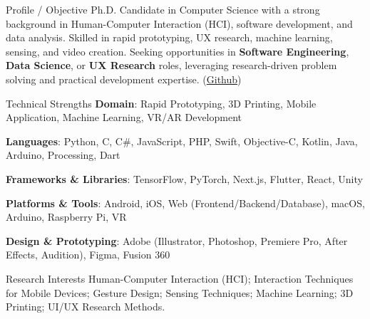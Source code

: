 \documentclass[
    11pt, %
]{resume} %
\begin{document}
\begin{rSection}{Profile / Objective}
Ph.D. Candidate in Computer Science with a strong background in Human-Computer Interaction (HCI), software development, and data analysis. Skilled in rapid prototyping, UX research, machine learning, sensing, and video creation. Seeking opportunities in \textbf{Software Engineering}, \textbf{Data Science}, or \textbf{UX Research} roles, leveraging research-driven problem solving and practical development expertise. (\href{https://github.com/KanKusakabe/}{Github})
\end{rSection}


\begin{rSection}{Technical Strengths}
\textbf{Domain}:
Rapid Prototyping, 3D Printing, Mobile Application, Machine Learning, VR/AR Development

\textbf{Languages}:
Python, C, C\#, JavaScript, PHP, Swift, Objective-C, Kotlin, Java, Arduino, Processing, Dart

\textbf{Frameworks \& Libraries}:
TensorFlow, PyTorch, Next.js, Flutter, React, Unity

\textbf{Platforms \& Tools}:
Android, iOS, Web (Frontend/Backend/Database), macOS, Arduino, Raspberry Pi, VR

\textbf{Design \& Prototyping}:
Adobe (Illustrator, Photoshop, Premiere Pro, After Effects, Audition), Figma, Fusion 360
\end{rSection}

\begin{rSection}{Research Interests}
Human-Computer Interaction (HCI); Interaction Techniques for Mobile Devices; Gesture Design; Sensing Techniques; Machine Learning; 3D Printing; UI/UX Research Methods.
\end{rSection}
\end{document}
